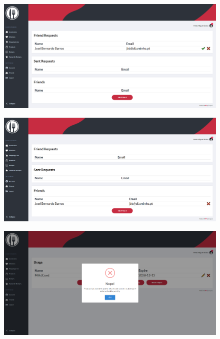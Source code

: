 \documentclass[a4paper]{report}
\begin{document}
    \begin{figure}[H]
        \centering
            \includegraphics[width=\textwidth]{images/produto_final/pedido_recebido.png}
    \end{figure}

    \begin{figure}[H]
        \centering
            \includegraphics[width=\textwidth]{images/produto_final/amigo_adicionado.png}
    \end{figure}

    \begin{figure}[H]
        \centering
            \includegraphics[width=\textwidth]{images/produto_final/exemplo_erro.png}
    \end{figure}
\end{document}
